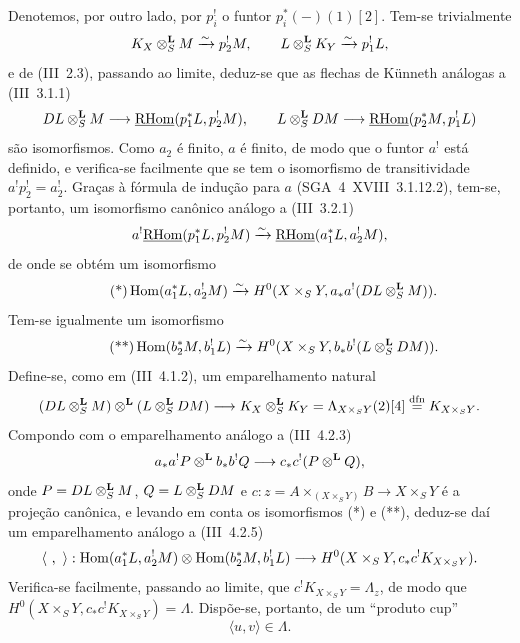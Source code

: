 Denotemos, por outro lado, por $p_i^!$ o funtor $p_i^*(-)(1)[2]$. Tem-se trivialmente
\[
K_X\otimes_S^{\mathbf L}M\xrightarrow{\sim}p_2^!M,
\qquad
L\otimes_S^{\mathbf L}K_Y\xrightarrow{\sim}p_1^!L,
\]
e de (III~2.3), passando ao limite, deduz-se que as flechas de Künneth análogas a (III~3.1.1)
\[
DL\otimes_S^{\mathbf L}M\longrightarrow \underline{\mathrm{RHom}}(p_1^*L,p_2^!M),
\qquad
L\otimes_S^{\mathbf L}DM\longrightarrow \underline{\mathrm{RHom}}(p_2^*M,p_1^!L)
\]
são isomorfismos. Como $a_2$ é finito, $a$ é finito, de modo que o funtor $a^!$ está definido, e verifica-se facilmente que se tem o isomorfismo de transitividade $a^!p_2^!=a_2^!$. Graças à fórmula de indução para $a$ (SGA~4~XVIII~3.1.12.2), tem-se, portanto, um isomorfismo canônico análogo a (III~3.2.1)
\[
a^!\underline{\mathrm{RHom}}(p_1^*L,p_2^!M)\xrightarrow{\sim}\underline{\mathrm{RHom}}(a_1^*L,a_2^!M),
\]
de onde se obtém um isomorfismo
\begin{equation}\tag{*}
\operatorname{Hom}(a_1^*L,a_2^!M)\xrightarrow{\sim}H^0(X\times_S Y,a_*a^!(DL\otimes_S^{\mathbf L}M)).
\end{equation}
Tem-se igualmente um isomorfismo
\begin{equation}\tag{**}
\operatorname{Hom}(b_2^*M,b_1^!L)\xrightarrow{\sim}H^0(X\times_S Y,b_*b^!(L\otimes_S^{\mathbf L}DM)).
\end{equation}
Define-se, como em (III~4.1.2), um emparelhamento natural
\[
(DL\otimes_S^{\mathbf L}M)\otimes^{\mathbf L}(L\otimes_S^{\mathbf L}DM)
\longrightarrow K_X\otimes_S^{\mathbf L}K_Y=\Lambda_{X\times_S Y}(2)[4]\stackrel{\mathrm{dfn}}{=}K_{X\times_S Y}.
\]
Compondo com o emparelhamento análogo a (III~4.2.3)
\[
a_*a^!P\otimes^{\mathbf L} b_*b^!Q\longrightarrow c_*c^!(P\otimes^{\mathbf L}Q),
\]
onde $P=DL\otimes_S^{\mathbf L}M$, $Q=L\otimes_S^{\mathbf L}DM$ e $c:z=A\times_{(X\times_S Y)}B\to X\times_S Y$ é a projeção canônica, e levando em conta os isomorfismos (*) e (**), deduz-se daí um emparelhamento análogo a (III~4.2.5)
\[
\langle\ ,\ \rangle:\Hom(a_1^*L,a_2^!M)\otimes\Hom(b_2^*M,b_1^!L)
\longrightarrow H^0(X\times_S Y,c_*c^!K_{X\times_S Y}).
\]
Verifica-se facilmente, passando ao limite, que $c^!K_{X\times_S Y}=\Lambda_z$, de modo que $H^0(X\times_S Y,c_*c^!K_{X\times_S Y})=\Lambda$. Dispõe-se, portanto, de um ``produto cup''
\begin{equation}\tag{1.1.2}
\langle u,v\rangle\in\Lambda.
\end{equation}
